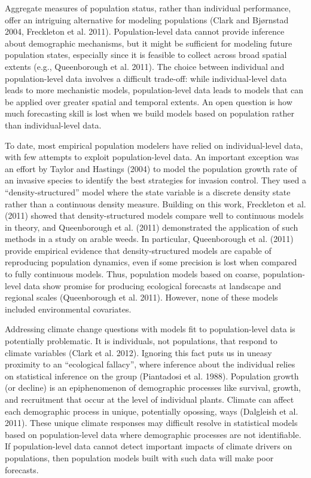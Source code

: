 \documentclass[12pt,]{article}
\begin{document}
Aggregate measures of population status, rather than individual
performance, offer an intriguing alternative for modeling populations
(Clark and Bjørnstad 2004, Freckleton et al. 2011). Population-level
data cannot provide inference about demographic mechanisms, but it might
be sufficient for modeling future population states, especially since it
is feasible to collect across broad spatial extents (e.g., Queenborough
et al. 2011). The choice between individual and population-level data
involves a difficult trade-off: while individual-level data leads to
more mechanistic models, population-level data leads to models that can
be applied over greater spatial and temporal extents. An open question
is how much forecasting skill is lost when we build models based on
population rather than individual-level data.

To date, most empirical population modelers have relied on
individual-level data, with few attempts to exploit population-level
data. An important exception was an effort by Taylor and Hastings (2004)
to model the population growth rate of an invasive species to identify
the best strategies for invasion control. They used a
``density-structured'' model where the state variable is a discrete
density state rather than a continuous density measure. Building on this
work, Freckleton et al. (2011) showed that density-structured models
compare well to continuous models in theory, and Queenborough et al.
(2011) demonstrated the application of such methods in a study on arable
weeds. In particular, Queenborough et al. (2011) provide empirical
evidence that density-structured models are capable of reproducing
population dynamics, even if some precision is lost when compared to
fully continuous models. Thus, population models based on coarse,
population-level data show promise for producing ecological forecasts at
landscape and regional scales (Queenborough et al. 2011). However, none
of these models included environmental covariates.

Addressing climate change questions with models fit to population-level
data is potentially problematic. It is individuals, not populations,
that respond to climate variables (Clark et al. 2012). Ignoring this
fact puts us in uneasy proximity to an ``ecological fallacy'', where
inference about the individual relies on statistical inference on the
group (Piantadosi et al. 1988). Population growth (or decline) is an
epiphenomenon of demographic processes like survival, growth, and
recruitment that occur at the level of individual plants. Climate can
affect each demographic process in unique, potentially opossing, ways
(Dalgleish et al. 2011). These unique climate responses may difficult
resolve in statistical models based on population-level data where
demographic processes are not identifiable. If population-level data
cannot detect important impacts of climate drivers on populations, then
population models built with such data will make poor forecasts.
\end{document}

